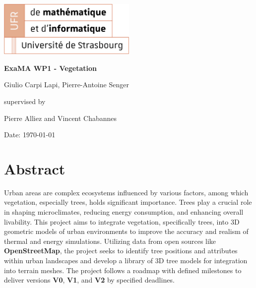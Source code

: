 \documentclass[12pt]{article}
\begin{document}
\begin{titlepage}
\centering
\includegraphics[width=0.5\textwidth]{images/logo_ufr.png}\par\vspace{1cm}
\vspace{1.5cm}
{\huge\bfseries ExaMA WP1 - Vegetation\par}
\vspace{2cm}
{\Large Giulio Carpi Lapi, Pierre-Antoine Senger\par}
\vfill
supervised by\par
Pierre Alliez and Vincent Chabannes

\vfill

{\large Date: \today\par}
\end{titlepage}

\tableofcontents
\newpage

\section{Abstract}
Urban areas are complex ecosystems influenced by various factors, among which 
vegetation, especially trees, holds significant importance. Trees play a crucial 
role in shaping microclimates, reducing energy consumption, and enhancing overall 
livability\cite{TIR4sTREEt}. This project aims to integrate vegetation, specifically trees, into 3D 
geometric models of urban environments to improve the accuracy and realism of thermal 
and energy simulations. Utilizing data from open sources like \textbf{OpenStreetMap},
the project seeks to identify tree positions and attributes within urban landscapes and develop 
a library of 3D tree models for integration into terrain meshes. The project follows
a roadmap with defined milestones to deliver versions \textbf{V0}, \textbf{V1},
and \textbf{V2} by specified  deadlines.
\end{document}
